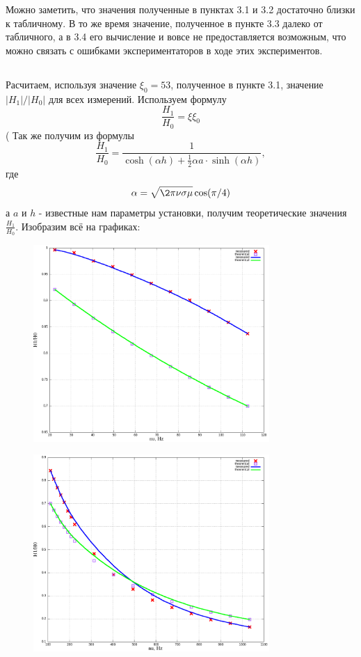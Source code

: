 \documentclass{article}
\begin{document}
Можно заметить, что значения полученные в пунктах 3.1 и 3.2 достаточно близки к табличному.
В то же время значение, полученное в пункте 3.3 далеко от табличного, а в 3.4 его вычисление
и вовсе не предоставляется возможным, что можно связать с ошибками экспериментаторов в ходе этих экспериментов.

\subsection{}
Расчитаем, используя значение \(\xi_0 = 53\), полученное в пункте 3.1, значение \(|H_1|/|H_0|\) для всех измерений.
Используем формулу
\[\frac{H_1}{H_0} = \xi\xi_0\]
(
Так же получим из формулы
\[ \frac{H_1}{H_0} = \frac{1}{\cosh(\alpha h) + \frac{1}{2}\alpha a\cdot\sinh(\alpha h)}, \]
где 
\[ \alpha = \sqrt{\2\pi\nu\sigma\mu}\cos(\pi/4) \]
а \(a\) и \(h\) - известные нам параметры установки, получим теоретические значения \(\frac{H_1}{H_0}\). 
Изобразим всё на графиках:

\begin{figure}[H]
    \centering
    \includegraphics[width=0.8\textwidth]{H-low.png}
    \label{H-low}
\end{figure}

\begin{figure}[H]
    \centering
    \includegraphics[width=0.8\textwidth]{H-mid.png}
    \label{H-mid}
\end{figure}
\end{document}

